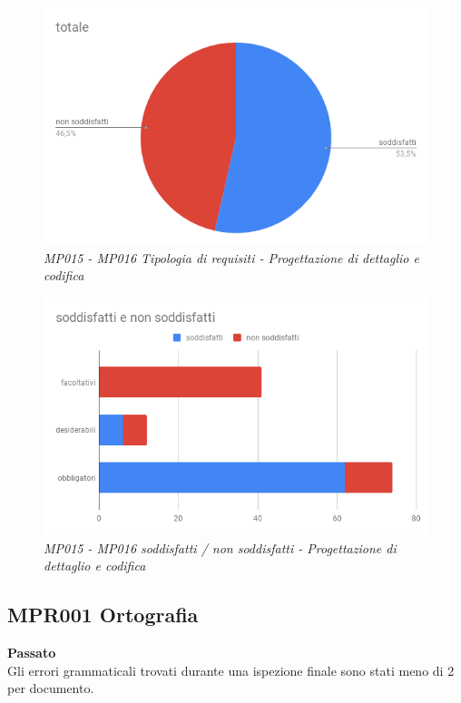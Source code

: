 \begin{figure} [H]
    \centering
	\includegraphics[scale=0.5]{./images/torsodPDC.png}
    \caption{\textit{MP015 - MP016 Tipologia di requisiti - Progettazione di dettaglio e codifica}}
\end{figure}
\begin{figure} [H]
    \centering
	\includegraphics[scale=0.5]{./images/barsodPDC.png}
    \caption{\textit{MP015 - MP016 soddisfatti / non soddisfatti - Progettazione di dettaglio e codifica}}
\end{figure}

\subsection{MPR001 Ortografia}
\textbf{Passato}\\
Gli errori grammaticali trovati durante una ispezione finale sono stati meno di 2 per documento.
